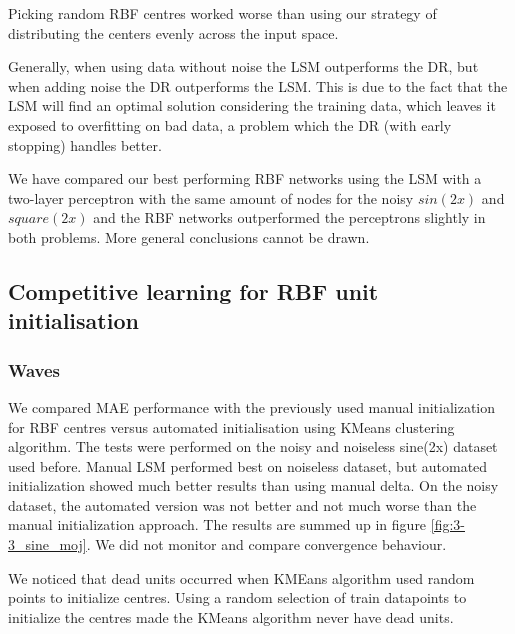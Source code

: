 \documentclass[a4paper]{article}
\begin{document}
Picking random RBF centres worked worse than using our strategy of distributing the centers evenly across the input space. 

Generally, when using data without noise the LSM outperforms the DR, but when adding noise the DR outperforms the LSM. This is due to the fact that the LSM will find an optimal solution considering the training data, which leaves it exposed to overfitting on bad data, a problem which the DR (with early stopping) handles better.

We have compared our best performing RBF networks using the LSM with a two-layer perceptron with the same amount of nodes for the noisy $sin(2x)$ and $square(2x)$ and the RBF networks outperformed the perceptrons slightly in both problems. More general conclusions cannot be drawn.

\subsection{Competitive learning for RBF unit initialisation} %

\subsubsection{Waves}

We compared MAE performance with the previously used manual initialization for RBF centres versus automated initialisation using KMeans clustering algorithm. The tests were performed on the noisy and noiseless sine(2x) dataset used before. Manual LSM performed best on noiseless dataset, but automated initialization showed much better results than using manual delta. On the noisy dataset, the automated version was not better and not much worse than the manual initialization approach. The results are summed up in figure \ref{fig:3-3_sine_moj}. We did not monitor and compare convergence behaviour.

We noticed that dead units occurred when KMEans algorithm used random points to initialize centres. Using a random selection of train datapoints to initialize the centres made the KMeans algorithm never have dead units.
\end{document}
